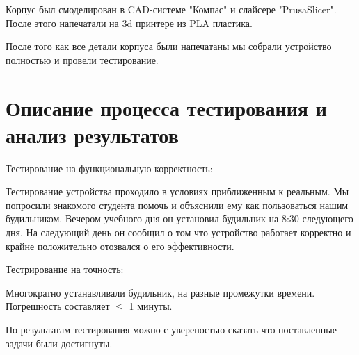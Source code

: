 \documentclass[12pt,a4paper]{article}
\begin{document}
Корпус был смоделирован в CAD-системе "Компас" и слайсере "PrusaSlicer". После этого напечатали на 3d принтере из PLA пластика.

После того как все детали корпуса были напечатаны мы собрали устройство полностью и провели тестирование.

\section{Описание процесса тестирования и анализ результатов}

Тестирование на функциональную корректность:

Тестирование устройства проходило в условиях приближенным к реальным. Мы попросили знакомого студента помочь и объяснили ему как пользоваться нашим будильником. Вечером учебного дня он установил будильник на 8:30 следующего дня. На следующий день он сообщил о том что устройство работает корректно и крайне положительно отозвался о его эффективности.

Тестрирование на точность:

Многократно устанавливали будильник, на разные промежутки времени. Погрешность составляет $\leqslant$ 1 минуты.

По результатам тестирования можно с увереностью сказать что поставленные задачи были достигнуты.
\end{document}
